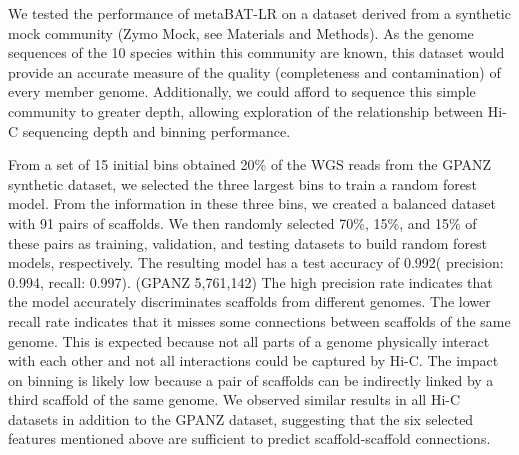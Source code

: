 \documentclass[fleqn,10pt,lineno]{wlpeerj}
\begin{document}
We tested the performance of metaBAT-LR on a dataset derived from a synthetic mock community (Zymo Mock, see Materials and Methods). As the genome sequences of the 10 species within this community are known, this dataset would provide an accurate measure of the quality (completeness and contamination) of every member genome. Additionally, we could afford to sequence this simple community to greater depth, allowing exploration of the relationship between Hi-C sequencing depth and binning performance.

From a set of 15 initial bins obtained 20\% of the WGS reads from the GPANZ synthetic dataset, we selected the three largest bins to train a random forest model. From the information in these three bins, we created a balanced dataset with 91 pairs of scaffolds. We then randomly selected 70\%, 15\%, and 15\% of these pairs as training, validation, and testing datasets to build random forest models, respectively. The resulting model has a test accuracy of 0.992( precision: 0.994, recall: 0.997). (GPANZ 5,761,142) The high precision rate indicates that the model accurately discriminates scaffolds from different genomes. The lower recall rate indicates that it misses some connections between scaffolds of the same genome. This is expected because not all parts of a genome physically interact with each other and not all interactions could be captured by Hi-C. The impact on binning is likely low because a pair of scaffolds can be indirectly linked by a third scaffold of the same genome.  We observed similar results in all Hi-C datasets in addition to the GPANZ dataset, suggesting that the six selected features mentioned above are sufficient to predict scaffold-scaffold connections. 
\end{document}
